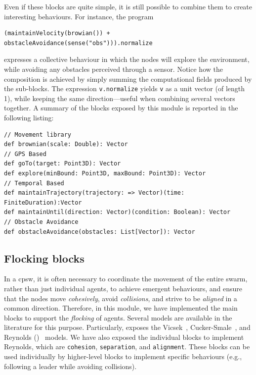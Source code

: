 Even if these blocks are quite simple, 
 it is still possible to combine them to create interesting behaviours. 
For instance, the program 
\begin{lstlisting}
(maintainVelocity(browian()) + obstacleAvoidance(sense("obs"))).normalize
\end{lstlisting}
expresses a collective behaviour in which the nodes will explore the environment,
 while avoiding any obstacles perceived through a sensor. 
Notice how the composition is achieved by simply summing the computational fields produced by the sub-blocks.
%
The expression \lstinline|v.normalize| yields \lstinline|v| as a unit vector (of length 1), while keeping the same direction---useful when combining several vectors together.
A summary of the blocks exposed by this module is reported in the following listing:
\begin{lstlisting}
// Movement library
def brownian(scale: Double): Vector
// GPS Based
def goTo(target: Point3D): Vector
def explore(minBound: Point3D, maxBound: Point3D): Vector
// Temporal Based
def maintainTrajectory(trajectory: => Vector)(time: FiniteDuration):Vector
def maintainUntil(direction: Vector)(condition: Boolean): Vector
// Obstacle Avoidance
def obstacleAvoidance(obstacles: List[Vector]): Vector
\end{lstlisting}

\subsection{Flocking blocks}\label{coordination2023-macro:subsec:flockig} 
In a \ac{cpsw}, 
 it is often necessary to coordinate the movement of the entire swarm, 
 rather than just individual agents, to achieve emergent behaviours,
 and ensure that the nodes move \emph{cohesively}, avoid \emph{collisions}, 
 and strive to be \emph{aligned} in a common direction. 
% 
Therefore, in this module, 
 we have implemented the main blocks to support the \emph{flocking} of agents. 
% 
Several models are available in the literature for this purpose.
 Particularly, \MacroSwarm{} exposes 
 the Vicsek~\cite{VicsekModeling1995}, 
 Cucker-Smale~\cite{CuckerSmaleModeling2007}, 
 and Reynolds ()~\cite{DBLP:conf/siggraph/Reynolds87} models. 
% 
% 
We have also exposed the individual blocks to implement Reynolds, 
 which are \lstinline|cohesion|, \lstinline|separation|, and \lstinline|alignment|. 
% 
These blocks can be used individually by higher-level blocks to implement specific behaviours 
 (e.g., following a leader while avoiding collisions). 

